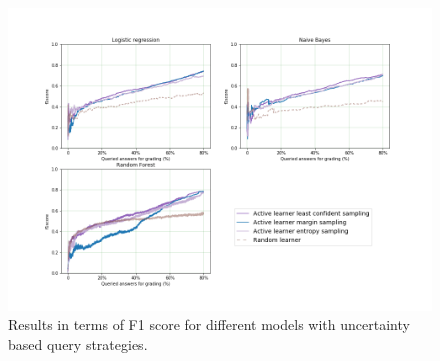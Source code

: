 \begin{figure}[!htb]
	\centering
	\includegraphics[scale=0.45]{images/task9_f1score_uncertainty}
	\caption{Results in terms of F1 score for different models with uncertainty based query strategies.}
	\label{t9_m_uncertainty_f1}
\end{figure}


